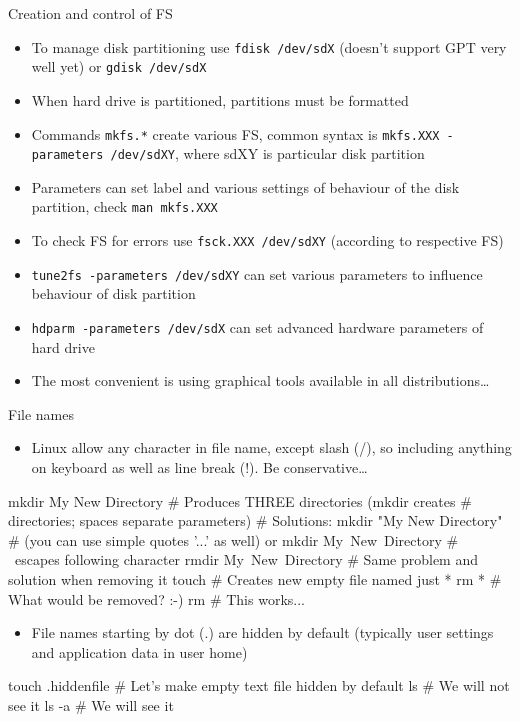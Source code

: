 \documentclass[hyperref={bookmarks=true, unicode=true, colorlinks=true, pdftitle={Linux, command line and MetaCentrum}, plainpages=false, pdfauthor={Vojtech Zeisek}, pdfsubject={Course about use of Linux command line, writing shell scripts and using MetaCentrum of CESNET}, pdfcreator={XeLaTeX, http://www.xelatex.org/}, pdfkeywords={Linux, GNU, BASH, shell, command line, MetaCentrum}, linkcolor=Sienna, anchorcolor=black, citecolor=green, filecolor=magenta, menucolor=Sienna, urlcolor=cyan, pdftex}, compress, ucs, xelatex, xcolor=svgnames, 11pt]{beamer}
\begin{document}
\begin{frame}{Creation and control of FS}
\begin{itemize}
  \item To manage disk partitioning use \texttt{fdisk /dev/sdX} (doesn't support GPT very well yet) or \texttt{gdisk /dev/sdX}
  \item When hard drive is partitioned, partitions must be formatted
  \item Commands \texttt{mkfs.*} create various FS, common syntax is \texttt{mkfs.XXX -parameters /dev/sdXY}, where sdXY is particular disk partition
  \item Parameters can set label and various settings of behaviour of the disk partition, check \texttt{man mkfs.XXX}
  \item To check FS for errors use \texttt{fsck.XXX /dev/sdXY} (according to respective FS)
  \item \texttt{tune2fs -parameters /dev/sdXY} can set various parameters to influence behaviour of disk partition
  \item \texttt{hdparm -parameters /dev/sdX} can set advanced hardware parameters of hard drive
  \item The most convenient is using graphical tools available in all distributions\ldots
\end{itemize}
\end{frame}

\begin{frame}[fragile]{File names}
\begin{itemize}
  \item Linux allow \alert{any} character in file name, except \alert{slash} (\alert{/}), so including anything on keyboard as well as line break (!). Be conservative\ldots
\end{itemize}
  \begin{bashcode}
    mkdir My New Directory # Produces THREE directories (mkdir creates
                           # directories; spaces separate parameters)
                           # Solutions:
    mkdir "My New Directory" # (you can use simple quotes '...' as well) or
    mkdir My\ New\ Directory # \ escapes following character
    rmdir My\ New\ Directory # Same problem and solution when removing it
    touch \* # Creates new empty file named just *
    rm * # What would be removed? :-)
    rm \* # This works...
  \end{bashcode}
\begin{itemize}
  \item File names starting by \alert{dot} (\alert{.}) are hidden by default (typically user settings and application data in user home)
\end{itemize}
  \begin{bashcode}
    touch .hiddenfile # Let's make empty text file hidden by default
    ls # We will not see it
    ls -a # We will see it
  \end{bashcode}
\end{frame}
\end{document}
